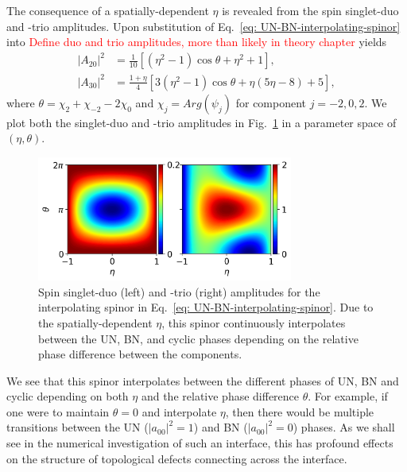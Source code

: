 The consequence of a spatially-dependent \(\eta \) is revealed from the spin
singlet-duo and -trio amplitudes.
Upon substitution of Eq.~\eqref{eq: UN-BN-interpolating-spinor} into
\textcolor{red}{Define duo and trio amplitudes, more than likely in theory
    chapter} yields
\begin{equation}
    \begin{aligned}
        |A_{20}|^2 & = \frac{1}{10} \left[(\eta^2-1)\cos\theta
        + \eta^2 + 1\right],                                          \\
        |A_{30}|^2 & = \frac{1+\eta}{4} \left[3\left(\eta ^2-1\right)
            \cos\theta
            + \eta(5 \eta -8) + 5\right],
    \end{aligned}
\end{equation}
where \(\theta = \chi_2 + \chi_{-2} - 2\chi_0\) and \(\chi_j = Arg(\psi_j)\) for
component \(j=-2, 0, 2\).
We plot both the singlet-duo and -trio amplitudes in
Fig.~\ref{fig: UN-BN-duo-trio} in a parameter space of \((\eta, \theta)\).
\begin{figure}
    \centering
    \includegraphics[width=0.75\textwidth]{gfx/ch-spin2/a20-a30-varying.png}
    \caption{\label{fig: UN-BN-duo-trio} Spin singlet-duo (left) and -trio
        (right) amplitudes for the interpolating spinor in
        Eq.~\eqref{eq: UN-BN-interpolating-spinor}.
        Due to the spatially-dependent \(\eta \), this spinor continuously
        interpolates between the UN, BN, and cyclic phases depending on the
        relative phase difference between the components.}
\end{figure}
We see that this spinor interpolates between the different phases of UN, BN and
cyclic depending on both \(\eta \) and the relative phase difference
\(\theta \).
For example, if one were to maintain \(\theta=0\) and interpolate \(\eta \),
then there would be multiple transitions between the UN (\(|a_{00}|^2 = 1\)) and
BN (\(|a_{00}|^2 = 0\)) phases.
As we shall see in the numerical investigation of such an interface, this has
profound effects on the structure of topological defects connecting across
the interface.

